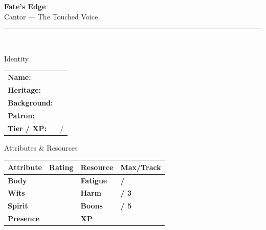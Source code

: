 \documentclass[10pt]{article}
\begin{document}
\begin{center}
    {\Huge\bfseries\sffamily\color{edgered} Fate's Edge}\\[0.2em]
    {\large\sffamily Cantor --- The Touched Voice}\\[0.5em]
    \rule{0.5\textwidth}{0.5pt}\\[1em]
\end{center}

\begin{minipage}[t]{0.48\linewidth}
    \begin{charbox}{Identity}
        \begin{tabular}{p{2.5cm} p{5cm}}
            \textbf{Name:} & \underline{\hspace{4cm}} \\
            \textbf{Heritage:} & \underline{\hspace{4cm}} \\
            \textbf{Background:} & \underline{\hspace{4cm}} \\
            \textbf{Patron:} & \underline{\hspace{4cm}} \\
            \textbf{Tier / XP:} & \underline{\hspace{2cm}} / \underline{\hspace{2cm}} \\
        \end{tabular}
    \end{charbox}
    
    \vspace{0.5em}
    
    \begin{charbox}{Attributes \& Resources}
        \begin{tabular}{>{\bfseries}p{2.5cm} >{\bfseries}p{1.5cm} >{\bfseries}p{2.5cm} >{\bfseries}p{1.5cm}}
            \toprule
            \textbf{Attribute} & \textbf{Rating} & \textbf{Resource} & \textbf{Max/Track} \\
            \midrule
            Body & \underline{\hspace{1.5cm}} & Fatigue & \underline{\hspace{1.5cm}} / \underline{\hspace{1.5cm}} \\
            Wits & \underline{\hspace{1.5cm}} & Harm & \underline{\hspace{1.5cm}} / 3 \\
            Spirit & \underline{\hspace{1.5cm}} & Boons & \underline{\hspace{1.5cm}} / 5 \\
            Presence & \underline{\hspace{1.5cm}} & XP & \underline{\hspace{1.5cm}} \\
            \bottomrule
        \end{tabular}
    \end{charbox}
    

\end{minipage}
\end{document}

